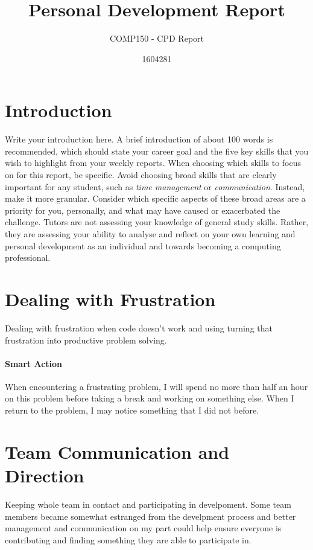 \documentclass{scrartcl}
\title{Personal Development Report}
\subtitle{COMP150 - CPD Report}
\author{1604281}
\begin{document}
\maketitle

\section{Introduction}

Write your introduction here. A brief introduction of about 100 words is recommended, which should state your career  goal and the five key skills that you wish to highlight from your weekly reports. When choosing which skills to focus on for this report, be specific. Avoid choosing broad skills that are clearly important for any student, such as \textit{time management} or \textit{communication}. Instead, make it more granular. Consider which specific aspects of these broad areas are a priority for you, personally, and what may have caused or exacerbated the challenge. Tutors are not assessing your knowledge of general study skills. Rather, they are assessing your ability to analyse and reflect on your own learning and personal development as an individual and towards becoming a computing professional.

\section{Dealing with Frustration}

Dealing with frustration when code doesn't work and using turning that frustration into productive problem solving.

\paragraph{Smart Action} When encountering a frustrating problem, I will spend no more than half an hour on this problem before taking a break and working on something else. When I return to the problem, I may notice something that I did not before.


\section{Team Communication and Direction}

Keeping whole team in contact and participating in develpoment. Some team members became somewhat estranged from the develpment process and better management and communication on my part could help ensure everyone is contributing and finding something they are able to participate in.
\end{document}
